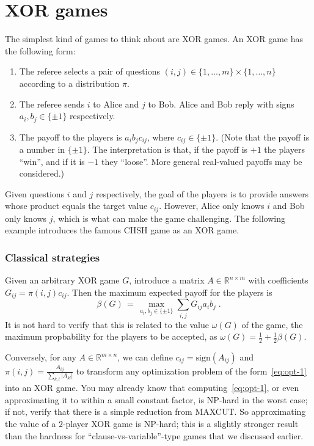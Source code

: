 \documentclass{report}
\theoremstyle{plain}
\theoremstyle{definition}
\theoremstyle{remark}
\newcommand{\R}{\ensuremath{\mathbb{R}}}
\numberwithin{equation}{subsection}
\begin{document}
\chapter{XOR games}
\label{chapter:xorgames}

The simplest kind of games to think about are XOR games. An XOR game has the following form:
\begin{enumerate}
  \item The referee selects a pair of questions $(i,j)\in \{1,\ldots, m\}\times \{1,\ldots, n\}$
   according to a distribution $\pi$. 
  \item The referee sends $i$ to Alice and $j$ to Bob. Alice and Bob reply with signs $a_i,b_j\in\{\pm 1\}$ respectively.
  \item The payoff to the players is $a_ib_jc_{ij}$, where $c_{ij}\in\{\pm 1\}$. (Note that the payoff is a number in $\{\pm 1\}$. The interpretation is that, if the payoff is $+1$ the players ``win'', and if it is $-1$ they ``loose''. More general real-valued payoffs may be considered.)
\end{enumerate}
Given questions $i$ and $j$ respectively, the goal of the players is to provide answers whose product equals the target value $c_{ij}$. However, Alice only knows $i$ and Bob only knows $j$, which is what can make the game challenging. The following example introduces the famous CHSH game as an XOR game. 



\subsection{Classical strategies}
\label{section:classicalstrats}

Given an arbitrary XOR game $G$, introduce a matrix $A\in\R^{n\times m}$ with coefficients $G_{ij}=\pi(i,j)c_{ij}$. Then the maximum expected payoff for the players is
 \begin{equation}\label{eq:opt-1}
 \beta(G) \,=\, \max_{a_i,b_j\in\{\pm 1\}}\sum_{i,j} G_{ij}a_ib_j \;.
 \end{equation}
It is not hard to verify that this is related to the value $\omega(G)$ of the game, the maximum propbability for the players to be accepted, as $\omega(G) = \frac{1}{2} + \frac{1}{2}\beta(G)$. 

Conversely, for any $A\in \R^{m\times n}$, we can define $c_{ij}=\text{sign}(A_{ij})$ and $\pi(i,j)=\frac{A_{ij}}{\sum_{k,l}|A_{kl}|}$ to transform any optimization problem of the form~\eqref{eq:opt-1} into an XOR game. You may already know that computing~\eqref{eq:opt-1}, or even approximating it to within a small constant factor, is NP-hard in the worst case; if not, verify that there is a simple reduction from MAXCUT. So approximating the value of a $2$-player XOR game is NP-hard; this is a slightly stronger result than the hardness for ``clause-vs-variable''-type games that we discussed earlier. 
\end{document}
